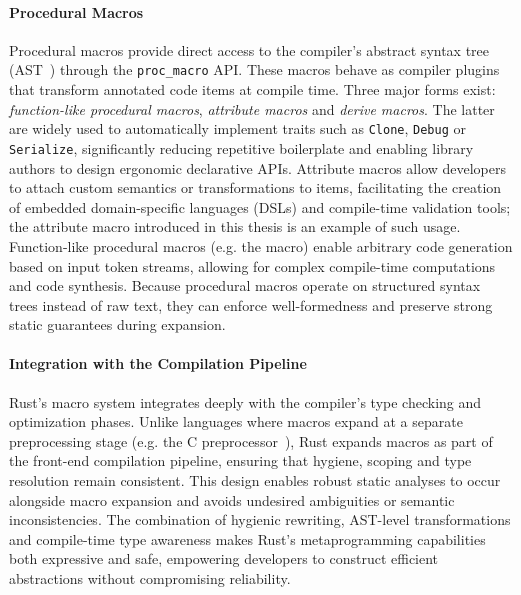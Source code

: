 \paragraph{Procedural Macros}
Procedural macros provide direct access to the compiler's abstract syntax tree (AST~\cite{Aho06,CloneDetection98}) through the \texttt{proc\_macro} API.
These macros behave as compiler plugins that transform annotated code items at compile time.
Three major forms exist: \textit{function-like procedural macros}, \textit{attribute macros} and \textit{derive macros}.
The latter are widely used to automatically implement traits such as \texttt{Clone}, \texttt{Debug} or \texttt{Serialize}, significantly reducing repetitive boilerplate and enabling library authors to design ergonomic declarative APIs.
Attribute macros allow developers to attach custom semantics or transformations to items, facilitating the creation of embedded domain-specific languages (DSLs) and compile-time validation tools; the \inlinerust{#[when(...)]} attribute macro introduced in this thesis is an example of such usage.
Function-like procedural macros (e.g. the  macro) enable arbitrary code generation based on input token streams, allowing for complex compile-time computations and code synthesis.
Because procedural macros operate on structured syntax trees instead of raw text, they can enforce well-formedness and preserve strong static guarantees during expansion.

\paragraph{Integration with the Compilation Pipeline}
Rust's macro system integrates deeply with the compiler's type checking and optimization phases.
Unlike languages where macros expand at a separate preprocessing stage (e.g. the C preprocessor~\cite{Dietrich2021CppSigET}), Rust expands macros as part of the front-end compilation pipeline, ensuring that hygiene, scoping and type resolution remain consistent.
This design enables robust static analyses to occur alongside macro expansion and avoids undesired ambiguities or semantic inconsistencies.
The combination of hygienic rewriting, AST-level transformations and compile-time type awareness makes Rust's metaprogramming capabilities both expressive and safe, empowering developers to construct efficient abstractions without compromising reliability.
